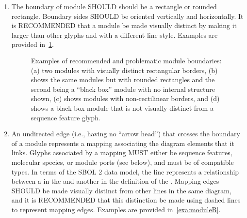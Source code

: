 \begin{enumerate}
\item The boundary of module SHOULD should be a rectangle or rounded rectangle. Boundary sides SHOULD be oriented vertically and horizontally.  
	It is RECOMMENDED that a module be made visually distinct by making it larger than other glyphs and with a different line style.
	Examples are provided in~\ref{exa:moduleA}.

	\begin{figure}[h!]
	\centering
	\caption{Examples of recommended and problematic module boundaries: (a) two modules with visually distinct rectangular borders, (b) shows the same modules but with rounded rectangles and the second being a ``black box'' module with no internal structure shown, (c) shows modules with non-rectilinear borders, and (d) shows a black-box module that is not visually distinct from a sequence feature glyph.}
	\label{exa:moduleA}
	\end{figure}

\item An undirected edge (i.e., having no ``arrow head'') that crosses the boundary of a module represents a mapping associating the diagram elements that it links. 
Glyphs associated by a mapping MUST either be sequence features, molecular species, or module ports (see below), and must be of compatible types.
In terms of the SBOL 2 data model, the line represents a  relationship between a  in the  and another  in the definition of the .
	Mapping edges SHOULD be made visually distinct from other lines in the same diagram, and it is RECOMMENDED that this distinction be made using dashed lines to represent mapping edges.
	Examples are provided in~\ref{exa:moduleB}.


\end{enumerate}
